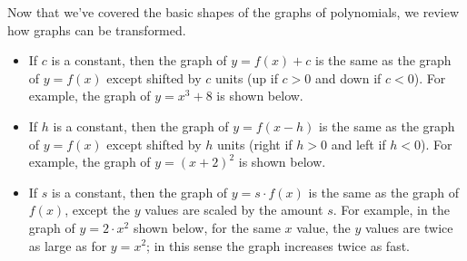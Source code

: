 \documentclass[11pt]{book}               %
\begin{document}
Now that we've covered the basic shapes of the graphs of polynomials, we review how graphs can be transformed.
\begin{itemize}
\item If $c$ is a constant, then the graph of $y = f(x) + c$ is the same as the graph of $y = f(x)$ except shifted by $c$ units (up if $c > 0$ and down if $c < 0$). For example, the graph of $y = x^3 + 8$ is shown below.

 \begin{center}
 \end{center}
 
\item If $h$ is a constant, then the graph of $y = f(x - h)$ is the same as the graph of $y = f(x)$ except shifted by $h$ units (right if $h > 0$ and left if $h < 0$). For example, the graph of $y = (x+2)^2$ is shown below.

\begin{center}
\end{center}

\item If $s$ is a constant, then the graph of $y = s\cdot f(x)$ is the same as the graph of $f(x)$, except the $y$ values are scaled by the amount $s$.  For example, in the graph of $y = 2 \cdot x^2$ shown below, for the same $x$ value, the $y$ values are twice as large as for $y = x^2$;  in this sense the graph increases twice as fast.

\begin{center}
\end{center}


\end{itemize}
\end{document}
